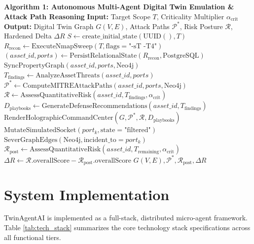 \documentclass[conference]{IEEEtran}
\begin{document}
\begin{algorithmic}[1]
\STATE \textbf{Algorithm 1: Autonomous Multi-Agent Digital Twin Emulation \& Attack Path Reasoning}
\STATE \textbf{Input:} Target Scope $T$, Criticality Multiplier $\alpha_{\text{crit}}$
\STATE \textbf{Output:} Digital Twin Graph $G(V, E)$, Attack Paths $\mathcal{P}^*$, Risk Posture $\mathcal{R}$, Hardened Delta $\Delta R$
\STATE $S \leftarrow \text{create\_initial\_state}(\text{UUID}(), T)$
\STATE $R_{\text{recon}} \leftarrow \text{ExecuteNmapSweep}(T, \text{flags}=\text{"-sT -T4"})$
\STATE $(asset\_id, ports) \leftarrow \text{PersistRelationalState}(R_{\text{recon}}, \text{PostgreSQL})$
\STATE $\text{SyncPropertyGraph}(asset\_id, ports, \text{Neo4j})$
\STATE $T_{\text{findings}} \leftarrow \text{AnalyzeAssetThreats}(asset\_id, ports)$
\STATE $\mathcal{P}^* \leftarrow \text{ComputeMITREAttackPaths}(asset\_id, ports, \text{Neo4j})$
\STATE $\mathcal{R} \leftarrow \text{AssessQuantitativeRisk}(asset\_id, T_{\text{findings}}, \alpha_{\text{crit}})$
\STATE $D_{\text{playbooks}} \leftarrow \text{GenerateDefenseRecommendations}(asset\_id, T_{\text{findings}})$
\STATE $\text{RenderHolographicCommandCenter}(G, \mathcal{P}^*, \mathcal{R}, D_{\text{playbooks}})$
    \STATE $\text{MutateSimulatedSocket}(port_k, \text{state}=\text{"filtered"})$
    \STATE $\text{SeverGraphEdges}(\text{Neo4j}, \text{incident\_to}=port_k)$
    \STATE $\mathcal{R}_{\text{post}} \leftarrow \text{AssessQuantitativeRisk}(asset\_id, T_{\text{remaining}}, \alpha_{\text{crit}})$
    \STATE $\Delta R \leftarrow \mathcal{R}.\text{overallScore} - \mathcal{R}_{\text{post}}.\text{overallScore}$
\ENDIF
\RETURN $G(V, E), \mathcal{P}^*, \mathcal{R}_{\text{post}}, \Delta R$
\end{algorithmic}

\section{System Implementation}
TwinAgentAI is implemented as a full-stack, distributed micro-agent framework. Table \ref{tab:tech_stack} summarizes the core technology stack specifications across all functional tiers.
\end{document}
